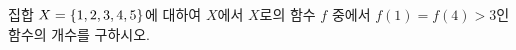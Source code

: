 집합 $X=\{1{,}\mkern3mu\mathopen{}2{,}\mkern3mu\mathopen{}3{,}\mkern3mu\mathopen{}4{,}\mkern3mu\mathopen{}5\}$에 대하여 $X$에서 $X$로의 함수 $f$ 중에서 $f(1)=f(4)>3$인 함수의 개수를 구하시오.
